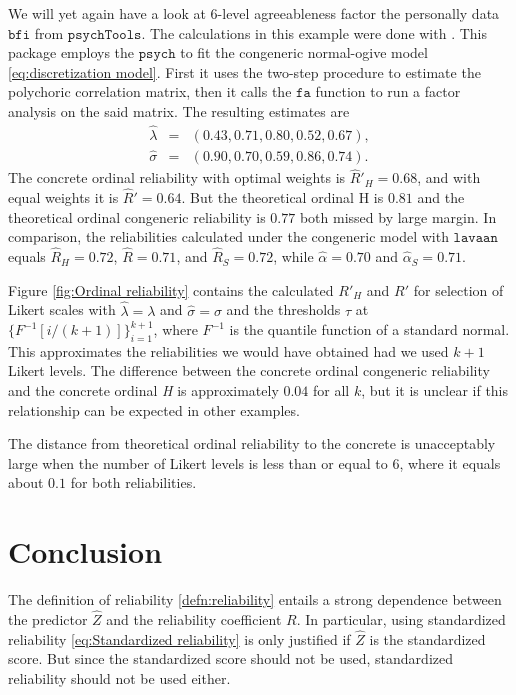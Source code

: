 \documentclass[twoside]{article}
\begin{document}
\begin{example}
We will yet again have a look at $6$-level agreeableness factor the
personally data $\mathtt{bfi}$ from $\mathtt{psychTools}$. The calculations in this example were done with \citep{conogive}. This package employs the $\mathtt{psych}$ \citep{psych} to fit the congeneric normal-ogive
model \eqref{eq:discretization model}. First it uses the two-step procedure
to estimate the polychoric correlation matrix, then it calls the $\mathtt{fa}$ function to run a factor analysis on the said matrix.
The resulting estimates are 
\begin{eqnarray*}
\hat{\lambda} & = & (0.43,0.71,0.80,0.52,0.67),\\
\hat{\sigma} & = & (0.90,0.70,0.59,0.86,0.74).
\end{eqnarray*} The concrete ordinal reliability
with optimal weights is $\hat{R}'_{H}=0.68$, and with equal weights
it is $\hat{R}'=0.64$. But the theoretical ordinal H is $0.81$ 
and the theoretical ordinal congeneric reliability is $0.77$ both missed by large margin. In comparison, the
reliabilities calculated under the congeneric model with $\mathtt{lavaan}$ \citep{Rosseel2012-yg}
equals $\hat{R}_{H}=0.72$, $\hat{R}=0.71$, and $\hat{R}_S = 0.72$, while $\hat{\alpha} = 0.70$ and $\hat{\alpha}_S = 0.71$.

Figure \ref{fig:Ordinal reliability} contains the calculated $ R'_{H}$ and $ R'$ for selection of Likert
scales with $\hat{\lambda} = \lambda$ and $\hat{\sigma}=\sigma$ and
the thresholds $\tau$ at $\{F^{-1}[i/(k+1)]\}_{i=1}^{k+1}$, where $F^{-1}$ is the quantile function of a standard normal. This
approximates the reliabilities we would have obtained had we used
$k+1$ Likert levels. The difference between the concrete ordinal congeneric reliability and the concrete ordinal \textit{H} is approximately $0.04$ for all $k$, but it is unclear if this relationship can be expected in other examples.

The distance from theoretical ordinal reliability to the concrete is unacceptably large when the number of Likert levels is less than or equal to $6$, where it equals about $0.1$ for both reliabilities. 
\end{example}


\section{Conclusion}
The definition of reliability \eqref{defn:reliability} entails a strong dependence between the predictor $\hat{Z}$ and the reliability coefficient $ R$. In particular, using standardized reliability \eqref{eq:Standardized reliability} is only justified if $\hat{Z}$ is the standardized score. But since the standardized score should not be used, standardized reliability should not be used either.
\end{document}
